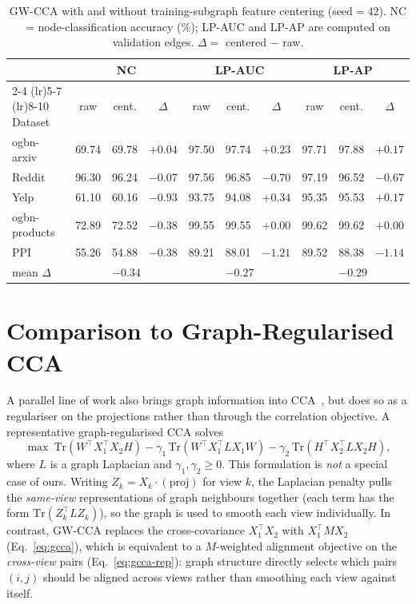 \documentclass{article}
\begin{document}
\begin{table}[h]
\centering
\small
\caption{GW-CCA with and without training-subgraph feature centering
(seed$=42$). NC = node-classification accuracy (\%); LP-AUC and LP-AP
are computed on validation edges. $\Delta = $ centered $-$ raw.}
\label{tab:centering-ablation}
\begin{tabular}{l ccc ccc ccc}
\toprule
& \multicolumn{3}{c}{NC} & \multicolumn{3}{c}{LP-AUC} & \multicolumn{3}{c}{LP-AP} \\
\cmidrule(lr){2-4} \cmidrule(lr){5-7} \cmidrule(lr){8-10}
Dataset & raw & cent. & $\Delta$ & raw & cent. & $\Delta$ & raw & cent. & $\Delta$ \\
\midrule
ogbn-arxiv    & 69.74 & 69.78 & $+0.04$ & 97.50 & 97.74 & $+0.23$ & 97.71 & 97.88 & $+0.17$ \\
Reddit        & 96.30 & 96.24 & $-0.07$ & 97.56 & 96.85 & $-0.70$ & 97.19 & 96.52 & $-0.67$ \\
Yelp          & 61.10 & 60.16 & $-0.93$ & 93.75 & 94.08 & $+0.34$ & 95.35 & 95.53 & $+0.17$ \\
ogbn-products & 72.89 & 72.52 & $-0.38$ & 99.55 & 99.55 & $+0.00$ & 99.62 & 99.62 & $+0.00$ \\
PPI           & 55.26 & 54.88 & $-0.38$ & 89.21 & 88.01 & $-1.21$ & 89.52 & 88.38 & $-1.14$ \\
\midrule
mean $\Delta$ & \multicolumn{3}{c}{$-0.34$} & \multicolumn{3}{c}{$-0.27$} & \multicolumn{3}{c}{$-0.29$} \\
\bottomrule
\end{tabular}
\end{table}

\section{Comparison to Graph-Regularised CCA}
\label{app:reg-cca}

A parallel line of work also brings graph information into
CCA~\citep{yuan2014graph,chen2018canonical,chen2018canonical2}, but does so
as a regulariser on the projections rather than through the correlation
objective. A representative graph-regularised CCA solves
\begin{equation}\label{eq:reg-cca}
\max\ \mathrm{Tr}(W^\top X_1^\top X_2 H)
- \gamma_1\,\mathrm{Tr}(W^\top X_1^\top L X_1 W)
- \gamma_2\,\mathrm{Tr}(H^\top X_2^\top L X_2 H),
\end{equation}
where $L$ is a graph Laplacian and $\gamma_1, \gamma_2 \geq 0$. This
formulation is \emph{not} a special case of ours. Writing
$Z_k = X_k \cdot (\text{proj})$ for view $k$, the Laplacian penalty pulls
the \emph{same-view} representations of graph neighbours together (each
term has the form $\mathrm{Tr}(Z_k^\top L Z_k)$), so the graph is used to
smooth each view individually. In contrast, GW-CCA replaces the
cross-covariance $X_1^\top X_2$ with $X_1^\top M X_2$
(Eq.~\ref{eq:gcca}), which is equivalent to a $M$-weighted alignment
objective on the \emph{cross-view} pairs (Eq.~\ref{eq:gcca-rep}): graph
structure directly selects which pairs $(i, j)$ should be aligned across
views rather than smoothing each view against itself.
\end{document}
